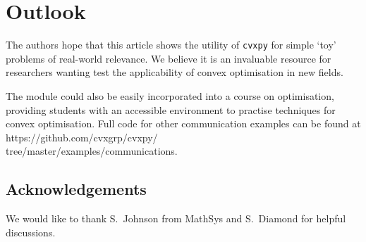 \documentclass[twocolumn,secnumarabic,amssymb, nobibnotes, aps, prl,superscriptaddress]{revtex4-1}
\begin{document}
\section{Outlook}
The authors hope that this article shows the utility of \texttt{cvxpy} for simple `toy' problems of real-world relevance. We believe it is an invaluable resource for researchers wanting test the applicability of convex optimisation in new fields. 

The module could also be easily incorporated into a course on optimisation, providing students with an accessible environment to practise techniques for convex optimisation. Full code for other communication examples can be found at https://github.com/cvxgrp/cvxpy/\\tree/master/examples/communications.



\subsection*{Acknowledgements}
We would like to thank S.~Johnson from MathSys and S.~Diamond for helpful discussions. 

\vspace{0.2cm}
 


\end{document}
